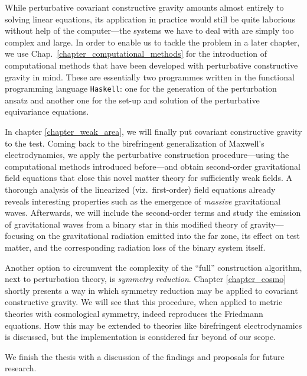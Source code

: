 While perturbative covariant constructive gravity amounts almost entirely to solving linear equations, its application in practice would still be quite laborious without help of the computer---the systems we have to deal with are simply too complex and large. In order to enable us to tackle the problem in a later chapter, we use Chap.~\ref{chapter_computational_methods} for the introduction of computational methods that have been developed with perturbative constructive gravity in mind. These are essentially two programmes written in the functional programming language \texttt{Haskell}: one for the generation of the perturbation ansatz and another one for the set-up and solution of the perturbative equivariance equations.

In chapter \ref{chapter_weak_area}, we will finally put covariant constructive gravity to the test. Coming back to the birefringent generalization of Maxwell's electrodynamics, we apply the perturbative construction procedure---using the computational methods introduced before---and obtain second-order gravitational field equations that close this novel matter theory for sufficiently weak fields. A thorough analysis of the linearized (viz.~first-order) field equations already reveals interesting properties such as the emergence of \emph{massive} gravitational waves. Afterwards, we will include the second-order terms and study the emission of gravitational waves from a binary star in this modified theory of gravity---focusing on the gravitational radiation emitted into the far zone, its effect on test matter, and the corresponding radiation loss of the binary system itself.

Another option to circumvent the complexity of the ``full'' construction algorithm, next to perturbation theory, is \emph{symmetry reduction}. Chapter \ref{chapter_cosmo} shortly presents a way in which symmetry reduction may be applied to covariant constructive gravity. We will see that this procedure, when applied to metric theories with cosmological symmetry, indeed reproduces the Friedmann equations. How this may be extended to theories like birefringent electrodynamics is discussed, but the implementation is considered far beyond of our scope.

We finish the thesis with a discussion of the findings and proposals for future research.

